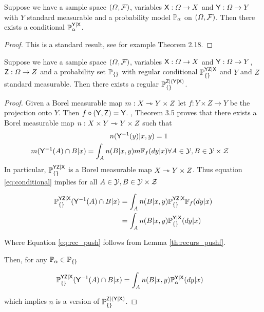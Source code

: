 \begin{theorem}
Suppose we have a sample space $(\Omega,\mathcal{F})$, variables $\mathsf{X}:\Omega\to X$ and $\mathsf{Y}:\Omega\to Y$ with $Y$ standard measurable and a probability model $\mathbb{P}_{\alpha}$ on $(\Omega,\mathcal{F})$. Then there exists a conditional $\mathbb{P}_\alpha^{\mathsf{Y}|\mathsf{X}}$.
\end{theorem}

\begin{proof}
This is a standard result, see for example \cite{cinlar_probability_2011} Theorem 2.18.
\end{proof}

\begin{theorem}\label{th:ho_cond_psets}
Suppose we have a sample space $(\Omega,\mathcal{F})$, variables $\mathsf{X}:\Omega\to X$ and $\mathsf{Y}:\Omega\to Y$, $\mathsf{Z}:\Omega\to Z$ and a probability set $\mathbb{P}_{\{\}}$ with regular conditional $\mathbb{P}_{\{\}}^{\mathsf{YZ}|\mathsf{X}}$ and $Y$ and $Z$ standard measurable. Then there exists a regular $\mathbb{P}_{\{\}}^{\mathsf{Z}|(\mathsf{Y}|\mathsf{X})}$.
\end{theorem}

\begin{proof}
Given a Borel measurable map $m:X\rightarrowtriangle Y\times Z$ let $f:Y\times Z\to Y$ be the projection onto $Y$. Then $f\circ (\mathsf{Y},\mathsf{Z})=\mathsf{Y}$. \citet{bogachev_kantorovich_2020}, Theorem 3.5 proves that there exists a Borel measurable map $n:X\times Y\rightarrowtriangle Y\times Z$  such that 
\begin{align}
    n(\mathsf{Y}^{-1}(y)|x,y) = 1\label{eq:proper}\\
    m(\mathsf{Y}^{-1}(A)\cap B|x) = \int_A n(B|x,y) m\mathbb{F}_{f}(dy|x)&\forall A\in \mathcal{Y},B\in\mathcal{Y\times Z}\label{eq:conditional}
\end{align}
In particular, $\mathbb{P}_{\{\}}^{\mathsf{YZ}|\mathsf{X}}$ is a Borel measurable map $X\rightarrowtriangle Y\times Z$. Thus equation \ref{eq:conditional} implies for all $A\in \mathcal{Y},B\in\mathcal{Y\times Z}$

\begin{align}
    \mathbb{P}_{\{\}}^{\mathsf{YZ}|\mathsf{X}}(\mathsf{Y}^{-1}(A)\cap B|x) &= \int_A n(B|x,y) \mathbb{P}_{\{\}}^{\mathsf{YZ}|\mathsf{X}}\mathbb{F}_{f}(dy|x)\\
    &=\int_A n(B|x,y) \mathbb{P}_{\{\}}^{\mathsf{Y}|\mathsf{X}}(dy|x)\label{eq:rec_push}
\end{align}

Where Equation \ref{eq:rec_push} follows from Lemma \ref{th:recurs_pushf}.

Then, for any $\mathbb{P}_\alpha\in\mathbb{P}_{\{\}}$

\begin{align}
    \mathbb{P}_{\{\}}^{\mathsf{YZ}|\mathsf{X}}(\mathsf{Y}^{-1}(A)\cap B|x) &= \int_A n(B|x,y) \mathbb{P}_{\alpha}^{\mathsf{Y}|\mathsf{X}}(dy|x)
\end{align}

which implies $n$ is a version of $\mathbb{P}_{\{\}}^{\mathsf{Z}|(\mathsf{Y}|\mathsf{X})}$.
\end{proof}


